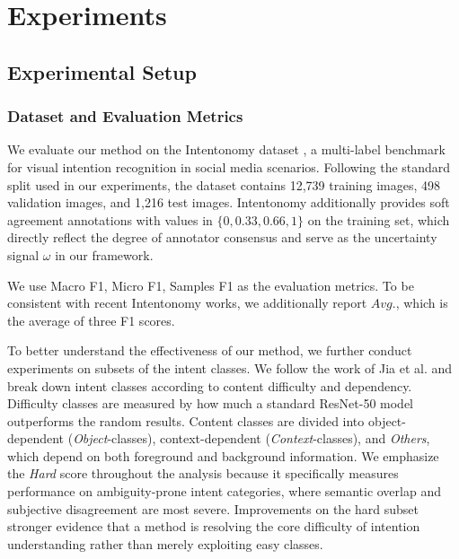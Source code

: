 \section{Experiments}
\label{sec:experiments}

\subsection{Experimental Setup}

\subsubsection{Dataset and Evaluation Metrics}
We evaluate our method on the Intentonomy dataset \cite{jia_intentonomy_2021}, a multi-label benchmark for visual intention recognition in social media scenarios. Following the standard split used in our experiments, the dataset contains 12,739 training images, 498 validation images, and 1,216 test images. Intentonomy additionally provides soft agreement annotations with values in $\{0, 0.33, 0.66, 1\}$ on the training set, which directly reflect the degree of annotator consensus and serve as the uncertainty signal $\omega$ in our framework.

We use Macro F1, Micro F1, Samples F1 as the evaluation metrics. To be consistent with recent Intentonomy works, we additionally report $\textit{Avg.}$, which is the average of three F1 scores. 

To better understand the effectiveness of our method, we further conduct experiments on subsets of the intent classes. We follow the work of Jia et al. \cite{jia_intentonomy_2021} and break down intent classes according to content difficulty and dependency. Difficulty classes are measured by how much a standard ResNet-50 model outperforms the random results. Content classes are divided into object-dependent ({\itshape Object}-classes), context-dependent ({\itshape Context}-classes), and {\itshape Others}, which depend on both foreground and background information. We emphasize the \textit{Hard} score throughout the analysis because it specifically measures performance on ambiguity-prone intent categories, where semantic overlap and subjective disagreement are most severe. Improvements on the hard subset  stronger evidence that a method is resolving the core difficulty of intention understanding rather than merely exploiting easy classes.

